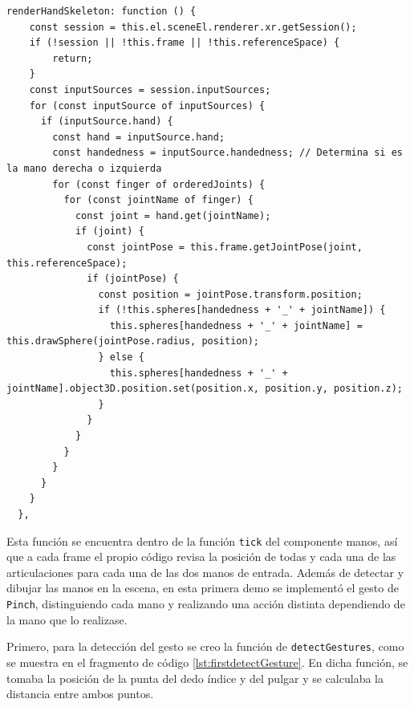 \documentclass[a4paper, 12pt]{book}
\begin{document}
\begin{lstlisting}[caption=Dibujo de las manos en la escena, captionpos=b, label=lst:manos-codigo]
  renderHandSkeleton: function () {
    const session = this.el.sceneEl.renderer.xr.getSession();
    if (!session || !this.frame || !this.referenceSpace) {
        return;
    }
    const inputSources = session.inputSources;
    for (const inputSource of inputSources) {
      if (inputSource.hand) {
        const hand = inputSource.hand;
        const handedness = inputSource.handedness; // Determina si es la mano derecha o izquierda
        for (const finger of orderedJoints) {
          for (const jointName of finger) {
            const joint = hand.get(jointName);
            if (joint) {
              const jointPose = this.frame.getJointPose(joint, this.referenceSpace);
              if (jointPose) {
                const position = jointPose.transform.position;
                if (!this.spheres[handedness + '_' + jointName]) {
                  this.spheres[handedness + '_' + jointName] = this.drawSphere(jointPose.radius, position);
                } else {
                  this.spheres[handedness + '_' + jointName].object3D.position.set(position.x, position.y, position.z);
                }
              }
            }
          }
        }
      }
    }
  },
\end{lstlisting}

Esta función se encuentra dentro de la función \texttt{tick} del componente manos, así que a cada frame el propio código revisa la posición de todas y cada una de las articulaciones para cada una 
de las dos manos de entrada.
Además de detectar y dibujar las manos en la escena, en esta primera demo se implementó el gesto de \texttt{Pinch}, distinguiendo cada mano y realizando una acción distinta dependiendo de la mano que lo realizase. 

Primero, para la detección del gesto se creo la función de \texttt{detectGestures}, como se muestra en el fragmento de código \ref{lst:firstdetectGesture}. En dicha función, se tomaba la posición de la punta del dedo índice y del pulgar y se calculaba la distancia entre ambos puntos.
\end{document}

